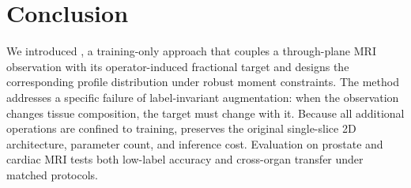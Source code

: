 \section{Conclusion}
We introduced \method, a training-only approach that couples a through-plane MRI observation with its operator-induced fractional target and designs the corresponding profile distribution under robust moment constraints. The method addresses a specific failure of label-invariant augmentation: when the observation changes tissue composition, the target must change with it. Because all additional operations are confined to training, \method preserves the original single-slice 2D architecture, parameter count, and inference cost. Evaluation on prostate and cardiac MRI tests both low-label accuracy and cross-organ transfer under matched protocols.
